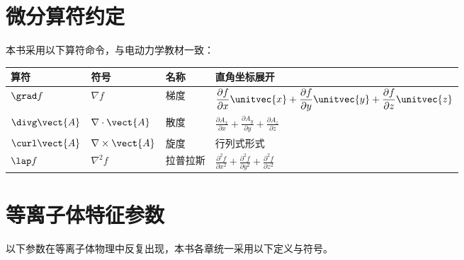 \section*{微分算符约定}

本书采用以下算符命令，与电动力学教材一致：
\begin{table}[htbp]
\centering
\begin{tabular}{@{}llll@{}}
\toprule
\textbf{算符} & \textbf{符号} & \textbf{名称} & \textbf{直角坐标展开} \\
\midrule
$\grad f$ & $\nabla f$ & 梯度 & $\displaystyle\frac{\partial f}{\partial x}\unitvec{x}+\frac{\partial f}{\partial y}\unitvec{y}+\frac{\partial f}{\partial z}\unitvec{z}$ \\
$\divg\vect{A}$ & $\nabla\cdot\vect{A}$ & 散度 & $\displaystyle\frac{\partial A_x}{\partial x}+\frac{\partial A_y}{\partial y}+\frac{\partial A_z}{\partial z}$ \\
$\curl\vect{A}$ & $\nabla\times\vect{A}$ & 旋度 & 行列式形式 \\
$\lap f$ & $\nabla^2 f$ & 拉普拉斯 & $\displaystyle\frac{\partial^2 f}{\partial x^2}+\frac{\partial^2 f}{\partial y^2}+\frac{\partial^2 f}{\partial z^2}$ \\
\bottomrule
\end{tabular}
\end{table}


\section*{等离子体特征参数}

以下参数在等离子体物理中反复出现，本书各章统一采用以下定义与符号。

